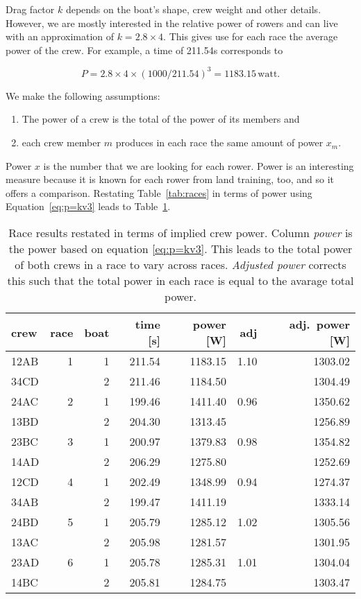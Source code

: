 \documentclass[a4paper,11pt]{article}
\begin{document}
Drag factor $k$ depends on the boat's shape, crew weight and other
details. However, we are mostly interested in the relative power of
rowers and can live with an approximation of $k = 2.8 \times 4$. This
gives use for each race the average power of the crew. For example, a
time of 211.54s corresponds to 

\begin{equation*}
P=2.8 \times 4 \times (1000/211.54)^3 = 1183.15\,\textrm{watt}.
\end{equation*}

We make the following assumptions:

\begin{enumerate}
\item The power of a crew is the total of the power of its
      members and 
\item each crew member $m$ produces in each
      race the same amount of power $x_m$.
\end{enumerate}

Power $x$ is the number that we are looking for each rower. Power is an
interesting measure because it is known for each rower from land
training, too, and so it offers a comparison.  Restating
Table~\ref{tab:races} in terms of power using Equation~\ref{eq:p=kv3}
leads to Table~\ref{tab:races_power}.

\begin{table}[ht]
\centering
\begin{tabular}{lrrrrrr}
  \toprule
 crew & race & boat & time [s] & power [W] & adj &  adj.~power [W]\\ 
  \midrule
  12AB &   1 & 1& 211.54 & 1183.15 & 1.10 & 1303.02 \\ 
  34CD &     & 2& 211.46 & 1184.50 &      & 1304.49 \\ [.8ex]
  24AC &   2 & 1& 199.46 & 1411.40 & 0.96 & 1350.62 \\ 
  13BD &     & 2& 204.30 & 1313.45 &      & 1256.89 \\ [.8ex]
  23BC &   3 & 1& 200.97 & 1379.83 & 0.98 & 1354.82 \\ 
  14AD &     & 2& 206.29 & 1275.80 &      & 1252.69 \\ [.8ex]
  12CD &   4 & 1& 202.49 & 1348.99 & 0.94 & 1274.37 \\ 
  34AB &     & 2& 199.47 & 1411.19 &      & 1333.14 \\ [.8ex]
  24BD &   5 & 1& 205.79 & 1285.12 & 1.02 & 1305.56 \\ 
  13AC &     & 2& 205.98 & 1281.57 &      & 1301.95 \\ [.8ex]
  23AD &   6 & 1& 205.78 & 1285.31 & 1.01 & 1304.04 \\ 
  14BC &     & 2& 205.81 & 1284.75 &      & 1303.47 \\ 
   \bottomrule
\end{tabular}
\caption{\label{tab:races_power} Race results restated in terms of
implied crew power. Column \emph{power} is the power based on equation
\ref{eq:p=kv3}. This leads to the total power of both crews in a race to
vary across races. \emph{Adjusted power} corrects this such that the
total power in each race is equal to the avarage total power.}
\end{table}
\end{document}
